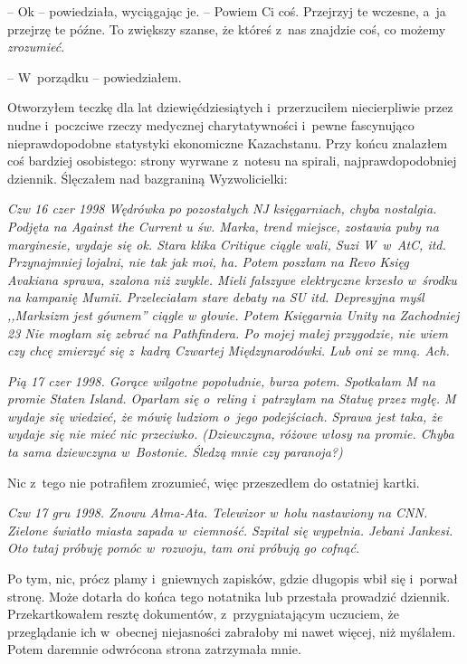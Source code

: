 \documentclass[oneside,polish,11pt,sfheadings]{mwbk}
\begin{document}
-- Ok -- powiedziała, wyciągając je. -- Powiem Ci coś. Przejrzyj te
wczesne, a~ja przejrzę te późne. To zwiększy szanse, że któreś z~nas
znajdzie coś, co możemy \textit{zrozumieć}.

-- W~porządku -- powiedziałem.

Otworzyłem teczkę dla lat dziewięćdziesiątych i~przerzuciłem
niecierpliwie przez nudne i~poczciwe rzeczy medycznej charytatywności i~pewne fascynująco nieprawdopodobne statystyki ekonomiczne Kazachstanu.
Przy końcu znalazłem coś bardziej osobistego: strony wyrwane z~notesu na
spirali, najprawdopodobniej dziennik. Ślęczałem nad bazgraniną
Wyzwolicielki:

\textit{Czw 16 czer 1998 Wędrówka po pozostałych NJ księgarniach, chyba
nostalgia. Podjęta na Against the Current u św. Marka, trend miejsce,
zostawia puby na marginesie, wydaje się ok. Stara klika Critique ciągle
wali, Suzi W~w~AtC, itd. Przynajmniej lojalni, nie tak jak moi, ha.
Potem poszłam na Revo Księg Avakiana sprawa, szalona niż zwykle. Mieli
fałszywe elektryczne krzesło w~środku na kampanię Mumii. Przeleciałam
stare debaty na SU itd. Depresyjna myśl ,,Marksizm jest gównem'' ciągle
w głowie. Potem Księgarnia Unity na Zachodniej 23 Nie mogłam się zebrać
na Pathfindera. Po mojej małej przygodzie, nie wiem czy chcę zmierzyć
się z~kadrą Czwartej Międzynarodówki. Lub oni ze mną. Ach.}

\textit{Pią 17 czer 1998. Gorące wilgotne popołudnie, burza potem.
Spotkałam M na promie Staten Island. Oparłam się o~reling i~patrzyłam na
Statuę przez mgłę. M wydaje się wiedzieć, że mówię ludziom o~jego
podejściach. Sprawa jest taka, że wydaje się nie mieć nic przeciwko.
(Dziewczyna, różowe włosy na promie. Chyba ta sama dziewczyna w~Bostonie. Śledzą mnie czy paranoja?)}

Nic z~tego nie potrafiłem zrozumieć, więc przeszedłem do ostatniej
kartki.

\textit{Czw 17 gru 1998. Znowu Ałma-Ata. Telewizor w~holu nastawiony na
CNN. Zielone światło miasta zapada w~ciemność. Szpital się wypełnia.
Jebani Jankesi. Oto tutaj próbuję pomóc w~rozwoju, tam oni próbują go
cofnąć.}

Po tym, nic, prócz plamy i~gniewnych zapisków, gdzie długopis wbił się i~porwał stronę. Może dotarła do końca tego notatnika lub przestała
prowadzić dziennik. Przekartkowałem resztę dokumentów, z~przygniatającym
uczuciem, że przeglądanie ich w~obecnej niejasności zabrałoby mi nawet
więcej, niż myślałem. Potem daremnie odwrócona strona zatrzymała mnie.
\end{document}
